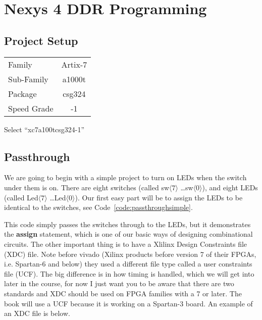 \chapter{Nexys 4 DDR Programming}

\section{Project Setup}

\begin{tabular}{l@{:}c}
Family & Artix-7\\
Sub-Family & a1000t\\
Package & csg324\\
Speed Grade & -1\\
\end{tabular}

Select ``xc7a100tcsg324-1''



\section{Passthrough}

We are going to begin with a simple project to turn on LEDs when the switch under them is on.  There are eight switches (called sw$\langle 7\rangle$ \ldots sw$\langle 0\rangle$), and eight LEDs  (called Led$\langle 7\rangle$ \ldots Led$\langle 0\rangle$).  Our first easy part will be to assign the LEDs to be identical to the switches, see Code~\ref{code:passthroughsimple}.


This code simply passes the switches through to the LEDs, but it demonstrates the \textbf{assign} statement, which is one of our basic ways of designing combinational circuits.  The other important thing is to have a Xlilinx Design Constraints file (XDC) file.  Note before vivado (Xilinx products before version 7 of their FPGAs, i.e. Spartan-6 and below) they used a different file type called a user constraints file (UCF).  The big difference is in how timing is handled, which we will get into later in the course, for now I just want you to be aware that there are two standards and XDC should be used on FPGA families with a 7 or later.  The book will use a UCF because it is working on a Spartan-3 board.  An example of an XDC file is below.


